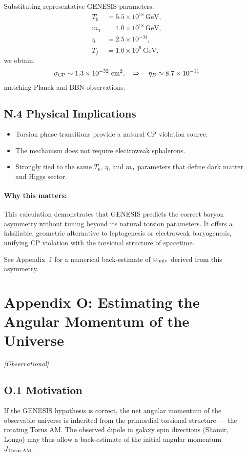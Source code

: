 \documentclass{article}
\newcommand{\obstag}{\textcolor{green!60!black}{\textit{[Observational]}}}
\begin{document}
Substituting representative GENESIS parameters:
\begin{align*}
T_0 &= 5.5 \times 10^{18}~\text{GeV}, \\
m_T &= 4.0 \times 10^{18}~\text{GeV}, \\
\eta &= 2.5 \times 10^{-34}, \\
T_f &= 1.0 \times 10^9~\text{GeV},
\end{align*}
we obtain:
\begin{equation}
\sigma_{\rm CP} \sim 1.3 \times 10^{-32}~\text{cm}^2, \quad \Rightarrow \quad \eta_B \approx 8.7 \times 10^{-11}
\end{equation}
matching Planck and BBN observations.

\subsection*{N.4 Physical Implications}
\begin{itemize}
  \item Torsion phase transitions provide a natural CP violation source.
  \item The mechanism does not require electroweak sphalerons.
  \item Strongly tied to the same $T_0$, $\eta$, and $m_T$ parameters that define dark matter and Higgs sector.
\end{itemize}

\paragraph{Why this matters:}
This calculation demonstrates that GENESIS predicts the correct baryon asymmetry without tuning beyond its natural torsion parameters. It offers a falsifiable, geometric alternative to leptogenesis or electroweak baryogenesis, unifying CP violation with the torsional structure of spacetime.


\noindent See Appendix~J for a numerical back-estimate of $\omega_{\rm univ}$ derived from this asymmetry.




\section*{Appendix O: Estimating the Angular Momentum of the Universe}
\label{app:universe-angular-momentum}
\obstag


\subsection*{O.1 Motivation}
If the GENESIS hypothesis is correct, the net angular momentum of the observable universe is inherited from the primordial torsional structure --- the rotating Torus AM. The observed dipole in galaxy spin directions (Shamir, Longo) may thus allow a back-estimate of the initial angular momentum $J_{\rm Torus\,AM}$.
\end{document}
